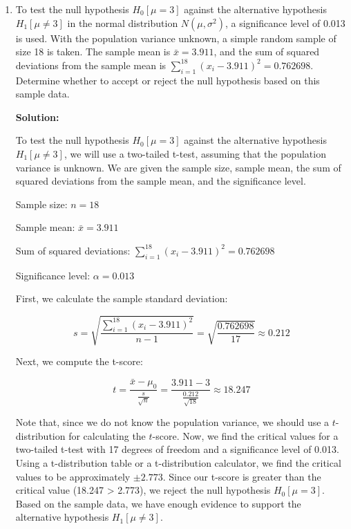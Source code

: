 \documentclass[12pt]{article}
\begin{document}
\begin{enumerate}
{Since our test statistic
\begin{align*}
	Z &= \frac{\bar{x} - \mu_0}{\sigma / \sqrt{n}} \\
	&= \frac{3.575 - 6}{2 / \sqrt{4}} \\
	&= -2.425
\end{align*}	
is below the critical value $Z_{(\alpha)} = -1.645$, we reject the null hypothesis.\medskip

In this case, there is evidence to support the null hypothesis ($H_0$) that $\mu = 6$.	

}

\item   To test the null hypothesis $H_0[\mu = 3]$ against the alternative hypothesis $H_1[\mu \neq 3]$ in the normal distribution $N(\mu, \sigma^2)$, a significance level of 0.013 is used. With the population variance unknown, a simple random sample of size 18 is taken. The sample mean is $\bar{x} = 3.911$, and the sum of squared deviations from the sample mean is $\sum_{i=1}^{18}(x_i - 3.911)^2 = 0.762698$. Determine whether to accept or reject the null hypothesis based on this sample data.

{\color{blue}
\noindent \textbf{Solution:}

To test the null hypothesis $H_0[\mu = 3]$ against the alternative hypothesis $H_1[\mu \neq 3]$, we will use a two-tailed t-test, assuming that the population variance is unknown. We are given the sample size, sample mean, the sum of squared deviations from the sample mean, and the significance level.
  
  Sample size: $n = 18$
  
  Sample mean: $\bar{x} = 3.911$
  
  Sum of squared deviations: $\sum_{i=1}^{18}(x_i - 3.911)^2 = 0.762698$
  
  Significance level: $\alpha = 0.013$
  
  First, we calculate the sample standard deviation:
  
  $$s = \sqrt{\frac{\sum_{i=1}^{18}(x_i - 3.911)^2}{n-1}} = \sqrt{\frac{0.762698}{17}} \approx 0.212$$
  
  Next, we compute the t-score:
  
  $$t = \frac{\bar{x} - \mu_0}{\frac{s}{\sqrt{n}}} = \frac{3.911 - 3}{\frac{0.212}{\sqrt{18}}} \approx 18.247$$
  
  Note that, since we do not know the population variance, we should use a $t$-distribution for calculating the $t$-score. Now, we find the critical values for a two-tailed t-test with 17 degrees of freedom and a significance level of 0.013. Using a t-distribution table or a t-distribution calculator, we find the critical values to be approximately $\pm 2.773$. Since our t-score is greater than the critical value (18.247 > 2.773), we reject the null hypothesis $H_0[\mu = 3]$. Based on the sample data, we have enough evidence to support the alternative hypothesis $H_1[\mu \neq 3]$.
  
}
\end{enumerate}
\end{document}
